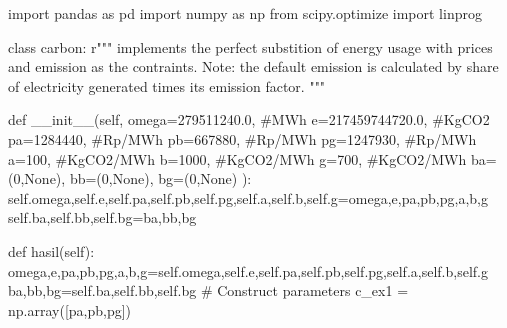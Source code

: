 \documentclass[
  a4paper,
  DIV=11,
  numbers=noendperiod]{scrartcl}
\newenvironment{Shaded}{\begin{snugshade}}{\end{snugshade}}
\newcommand{\CommentTok}[1]{\textcolor[rgb]{0.37,0.37,0.37}{#1}}
\newcommand{\DecValTok}[1]{\textcolor[rgb]{0.68,0.00,0.00}{#1}}
\newcommand{\FloatTok}[1]{\textcolor[rgb]{0.68,0.00,0.00}{#1}}
\newcommand{\FunctionTok}[1]{\textcolor[rgb]{0.28,0.35,0.67}{#1}}
\newcommand{\ImportTok}[1]{\textcolor[rgb]{0.00,0.46,0.62}{#1}}
\newcommand{\KeywordTok}[1]{\textcolor[rgb]{0.00,0.23,0.31}{#1}}
\newcommand{\NormalTok}[1]{\textcolor[rgb]{0.00,0.23,0.31}{#1}}
\newcommand{\OperatorTok}[1]{\textcolor[rgb]{0.37,0.37,0.37}{#1}}
\newcommand{\VariableTok}[1]{\textcolor[rgb]{0.07,0.07,0.07}{#1}}
\begin{document}
\begin{Shaded}
\begin{Highlighting}[]
\ImportTok{import}\NormalTok{ pandas }\ImportTok{as}\NormalTok{ pd}
\ImportTok{import}\NormalTok{ numpy }\ImportTok{as}\NormalTok{ np}
\ImportTok{from}\NormalTok{ scipy.optimize }\ImportTok{import}\NormalTok{ linprog}

\KeywordTok{class}\NormalTok{ carbon:}
  \CommentTok{r"""}
\CommentTok{  implements the perfect substition of energy usage with prices and emission as the contraints. Note: the default emission is calculated by share of electricity generated times its emission factor.}
\CommentTok{  """}
  
  \KeywordTok{def} \FunctionTok{\_\_init\_\_}\NormalTok{(}\VariableTok{self}\NormalTok{, omega}\OperatorTok{=}\FloatTok{279511240.0}\NormalTok{,  }\CommentTok{\#MWh}
\NormalTok{                     e}\OperatorTok{=}\FloatTok{217459744720.0}\NormalTok{,   }\CommentTok{\#KgCO2}
\NormalTok{                     pa}\OperatorTok{=}\DecValTok{1284440}\NormalTok{,         }\CommentTok{\#Rp/MWh}
\NormalTok{                     pb}\OperatorTok{=}\DecValTok{667880}\NormalTok{,          }\CommentTok{\#Rp/MWh}
\NormalTok{                     pg}\OperatorTok{=}\DecValTok{1247930}\NormalTok{,         }\CommentTok{\#Rp/MWh}
\NormalTok{                     a}\OperatorTok{=}\DecValTok{100}\NormalTok{,              }\CommentTok{\#KgCO2/MWh}
\NormalTok{                     b}\OperatorTok{=}\DecValTok{1000}\NormalTok{,             }\CommentTok{\#KgCO2/MWh}
\NormalTok{                     g}\OperatorTok{=}\DecValTok{700}\NormalTok{,              }\CommentTok{\#KgCO2/MWh}
\NormalTok{                     ba}\OperatorTok{=}\NormalTok{(}\DecValTok{0}\NormalTok{,}\VariableTok{None}\NormalTok{),}
\NormalTok{                     bb}\OperatorTok{=}\NormalTok{(}\DecValTok{0}\NormalTok{,}\VariableTok{None}\NormalTok{),}
\NormalTok{                     bg}\OperatorTok{=}\NormalTok{(}\DecValTok{0}\NormalTok{,}\VariableTok{None}\NormalTok{)}
\NormalTok{                     ):}
    \VariableTok{self}\NormalTok{.omega,}\VariableTok{self}\NormalTok{.e,}\VariableTok{self}\NormalTok{.pa,}\VariableTok{self}\NormalTok{.pb,}\VariableTok{self}\NormalTok{.pg,}\VariableTok{self}\NormalTok{.a,}\VariableTok{self}\NormalTok{.b,}\VariableTok{self}\NormalTok{.g}\OperatorTok{=}\NormalTok{omega,e,pa,pb,pg,a,b,g}
    \VariableTok{self}\NormalTok{.ba,}\VariableTok{self}\NormalTok{.bb,}\VariableTok{self}\NormalTok{.bg}\OperatorTok{=}\NormalTok{ba,bb,bg}
    
  \KeywordTok{def}\NormalTok{ hasil(}\VariableTok{self}\NormalTok{):}
\NormalTok{    omega,e,pa,pb,pg,a,b,g}\OperatorTok{=}\VariableTok{self}\NormalTok{.omega,}\VariableTok{self}\NormalTok{.e,}\VariableTok{self}\NormalTok{.pa,}\VariableTok{self}\NormalTok{.pb,}\VariableTok{self}\NormalTok{.pg,}\VariableTok{self}\NormalTok{.a,}\VariableTok{self}\NormalTok{.b,}\VariableTok{self}\NormalTok{.g}
\NormalTok{    ba,bb,bg}\OperatorTok{=}\VariableTok{self}\NormalTok{.ba,}\VariableTok{self}\NormalTok{.bb,}\VariableTok{self}\NormalTok{.bg}
    \CommentTok{\# Construct parameters}
\NormalTok{    c\_ex1 }\OperatorTok{=}\NormalTok{ np.array([pa,pb,pg])}


\end{Highlighting}
\end{Shaded}
\end{document}
